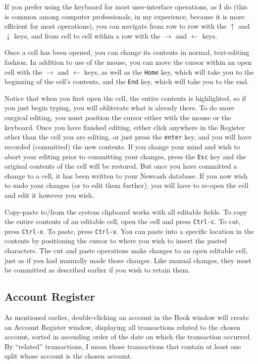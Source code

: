 \documentclass{report}
\begin{document}
If you prefer using the keyboard for most user-interface operations, as I do (this is common among computer professionals, in my experience, because it is more efficient for most operations), you can navigate from row to row with the $\uparrow$ and $\downarrow$ keys, and from cell to cell within a row with the $\rightarrow$ and $\leftarrow$ keys.

Once a cell has been opened, you can change its contents in normal, text-editing fashion. In addition to use of the mouse, you can move the cursor within an open cell with the $\rightarrow$ and $\leftarrow$ keys, as well as the \verb|Home| key, which will take you to the beginning of the cell's contents, and the \verb|End| key, which will take you to the end.

Notice that when you first open the cell, the entire contents is highlighted, so if you just begin typing, you will obliterate what is already there. To do more surgical editing, you must position the cursor either with the mouse or the keyboard. Once you have finished editing, either click anywhere in the Register other than the cell you are editing, or just press the \verb|enter| key,  and you will have recorded (committed) the new contents. If you change your mind and wish to abort your editing prior to committing your changes, press the \verb|Esc| key and the original contents of the cell will be restored.  But once you have committed a change to a cell, it has been written to your Newcash database. If you now wish to undo your changes (or to edit them further), you will have to re-open the cell and edit it however you wish. 

Copy-paste to/from the system clipboard works with all editable fields. To copy the entire contents of an editable cell, open the cell and press \verb|Ctrl-c|. To cut, press \verb|Ctrl-x|. To paste, press \verb|Ctrl-v|. You can paste into a specific location in the contents by positioning the cursor to where you wish to insert the pasted characters. The cut and paste operations make changes to an open editable cell, just as if you had manually made those changes. Like manual changes, they must be committed as described earlier if you wish to retain them. 


\subsection{Account Register}
\label{Account register}
As mentioned earlier, double-clicking an account in the Book window will create an Account Register window, displaying all transactions related to the chosen account, sorted in ascending order of the date on which the transaction occurred. By ``related'' transactions, I mean those transactions that contain at least one split whose account is the chosen account. 
\end{document}
